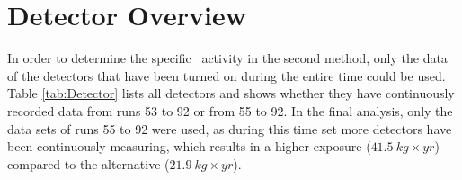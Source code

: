 \appendix


\chapter{Detector Overview}

In order to determine the specific \Kr\ activity in the second method, only the data of the detectors that have been turned on during the entire time could be used.
Table \ref{tab:Detector} lists all detectors and shows whether they have continuously recorded data from runs 53 to 92 or from 55 to 92.
In the final analysis, only the data sets of runs 55 to 92 were used, as during this time set more detectors have been continuously measuring, which results in a higher exposure ($41.5 \ \unit{kg}\times\unit{yr}$) compared to the alternative ($21.9 \ \unit{kg}\times\unit{yr}$).
